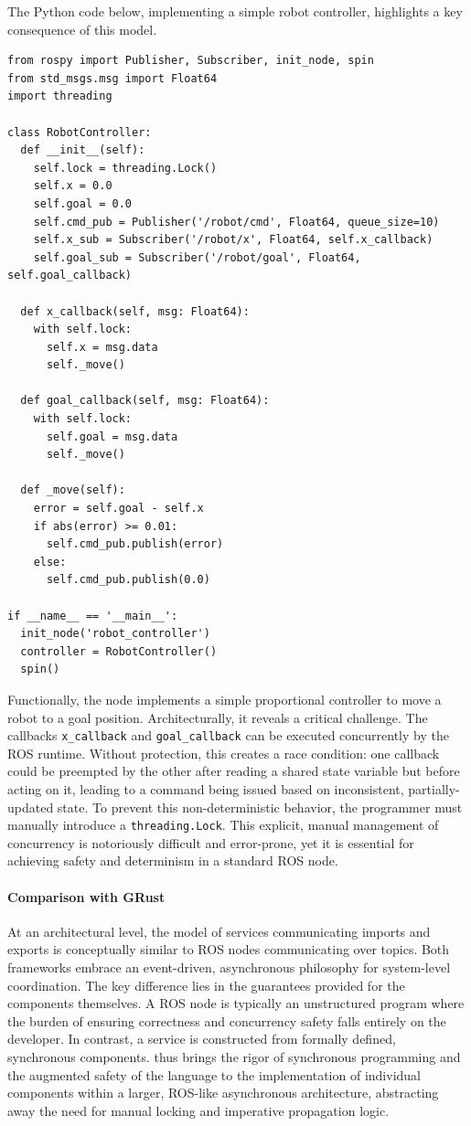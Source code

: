 The Python code below, implementing a simple robot controller, highlights a key consequence of
this model.

\begin{lstlisting}[basicstyle=\ttfamily\footnotesize\color{BlackText}]
from rospy import Publisher, Subscriber, init_node, spin
from std_msgs.msg import Float64
import threading

class RobotController:
  def __init__(self):
    self.lock = threading.Lock()
    self.x = 0.0
    self.goal = 0.0
    self.cmd_pub = Publisher('/robot/cmd', Float64, queue_size=10)
    self.x_sub = Subscriber('/robot/x', Float64, self.x_callback)
    self.goal_sub = Subscriber('/robot/goal', Float64, self.goal_callback)

  def x_callback(self, msg: Float64):
    with self.lock:
      self.x = msg.data
      self._move()

  def goal_callback(self, msg: Float64):
    with self.lock:
      self.goal = msg.data
      self._move()

  def _move(self):
    error = self.goal - self.x
    if abs(error) >= 0.01:
      self.cmd_pub.publish(error)
    else:
      self.cmd_pub.publish(0.0)

if __name__ == '__main__':
  init_node('robot_controller')
  controller = RobotController()
  spin()
\end{lstlisting}

Functionally, the node implements a simple proportional controller to move a robot to a goal
position. Architecturally, it reveals a critical challenge. The callbacks \texttt{x\_callback} and
\texttt{goal\_callback} can be executed concurrently by the ROS runtime. Without protection, this
creates a race condition: one callback could be preempted by the other after reading a shared state
variable but before acting on it, leading to a command being issued based on inconsistent,
partially-updated state. To prevent this non-deterministic behavior, the programmer must manually
introduce a \texttt{threading.Lock}. This explicit, manual management of concurrency is notoriously
difficult and error-prone, yet it is essential for achieving safety and determinism in a standard
ROS node.

\paragraph*{Comparison with GRust}
At an architectural level, the \GRust model of services communicating \via imports and exports is
conceptually similar to ROS nodes communicating over topics. Both frameworks embrace an
event-driven, asynchronous philosophy for system-level coordination. The key difference lies in the
guarantees provided for the components themselves. A ROS node is typically an unstructured program
where the burden of ensuring correctness and concurrency safety falls entirely on the developer. In
contrast, a \GRust service is constructed from formally defined, synchronous \GRSync components.
\GRust thus brings the rigor of synchronous programming and the augmented safety of the \Rust
language to the implementation of individual components within a larger, ROS-like asynchronous
architecture, abstracting away the need for manual locking and imperative propagation logic.

